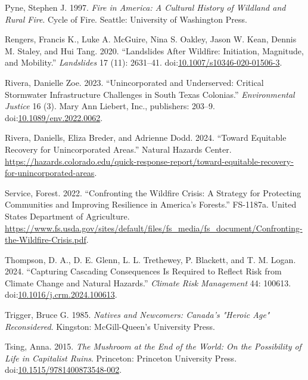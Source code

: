 \documentclass[
]{article}
\newlength{\cslhangindent}
\newenvironment{CSLReferences}[2] %
 {\begin{list}{}{%
  \setlength{\itemindent}{0pt}
  \setlength{\leftmargin}{0pt}
  \setlength{\parsep}{0pt}
  \ifodd #1
   \setlength{\leftmargin}{\cslhangindent}
   \setlength{\itemindent}{-1\cslhangindent}
  \fi
  \setlength{\itemsep}{#2\baselineskip}}}
 {\end{list}}
\begin{document}
\begin{CSLReferences}{1}{0}
Pyne, Stephen J. 1997. \emph{Fire in {America}: A Cultural History of Wildland and Rural Fire}. Cycle of Fire. Seattle: University of Washington Press.

Rengers, Francis K., Luke A. McGuire, Nina S. Oakley, Jason W. Kean, Dennis M. Staley, and Hui Tang. 2020. {``Landslides After Wildfire: Initiation, Magnitude, and Mobility.''} \emph{Landslides} 17 (11): 2631--41. doi:\href{https://doi.org/10.1007/s10346-020-01506-3}{10.1007/s10346-020-01506-3}.

Rivera, Danielle Zoe. 2023. {``Unincorporated and {Underserved}: {Critical Stormwater Infrastructure Challenges} in {South Texas Colonias}.''} \emph{Environmental Justice} 16 (3). Mary Ann Liebert, Inc., publishers: 203--9. doi:\href{https://doi.org/10.1089/env.2022.0062}{10.1089/env.2022.0062}.

Rivera, Daniells, Eliza Breder, and Adrienne Dodd. 2024. {``Toward {Equitable Recovery} for {Unincorporated Areas}.''} Natural Hazards Center. \url{https://hazards.colorado.edu/quick-response-report/toward-equitable-recovery-for-unincorporated-areas}.

Service, Forest. 2022. {``Confronting the {Wildfire Crisis}: {A Strategy} for {Protecting Communities} and {Improving Resilience} in {America}'s {Forests}.''} FS-1187a. United States Department of Agriculture. \url{https://www.fs.usda.gov/sites/default/files/fs_media/fs_document/Confronting-the-Wildfire-Crisis.pdf}.

Thompson, D. A., D. E. Glenn, L. L. Trethewey, P. Blackett, and T. M. Logan. 2024. {``Capturing Cascading Consequences Is Required to Reflect Risk from Climate Change and Natural Hazards.''} \emph{Climate Risk Management} 44: 100613. doi:\href{https://doi.org/10.1016/j.crm.2024.100613}{10.1016/j.crm.2024.100613}.

Trigger, Bruce G. 1985. \emph{Natives and Newcomers: {Canada}'s "{Heroic Age}" Reconsidered}. Kingston: McGill-Queen's University Press.

Tsing, Anna. 2015. \emph{The {Mushroom} at the {End} of the {World}: {On} the {Possibility} of {Life} in {Capitalist Ruins}}. Princeton: Princeton University Press. doi:\href{https://doi.org/10.1515/9781400873548-002}{10.1515/9781400873548-002}.


\end{CSLReferences}
\end{document}

